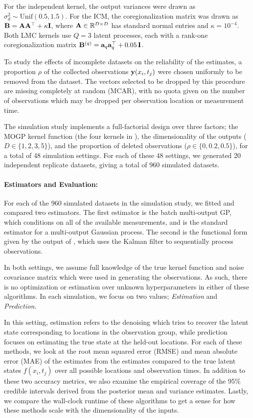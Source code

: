 \documentclass[10pt]{article}
\numberwithin{equation}{section}
\begin{document}
For the independent kernel, the output variances were drawn as $\sigma^{2}_{d} \sim \mathrm{Unif}(0.5, 1.5)$. For the ICM, the coregionalization matrix was drawn as $\mathbf{B} = \mathbf{A}\mathbf{A}^{\top} + \kappa\mathbf{I}$, where $\mathbf{A} \in \mathbb{R}^{D \times D}$ has standard normal entries and $\kappa = 10^{-4}$. Both LMC kernels use $Q = 3$ latent processes, each with a rank-one coregionalization matrix $\mathbf{B}^{(q)} = \mathbf{a}_{q}\mathbf{a}_{q}^{\top} + 0.05\,\mathbf{I}$.

To study the effects of incomplete datasets on the reliability of the estimates, a proportion $\rho$ of the collected observations $\mathbf{y}(x_{i}, t_{j})$ were chosen uniformly to be removed from the dataset. The vectors selected to be dropped by this procedure are missing completely at random (MCAR), with no quota given on the number of observations which may be dropped per observation location or measurement time.

The simulation study implements a full-factorial design over three factors; the MOGP kernel function (the four kernels in ), the dimensionality of the outputs ($D \in \{1, 2, 3, 5\}$), and the proportion of deleted observations ($\rho \in \{0, 0.2, 0.5\}$), for a total of 48 simulation settings. For each of these 48 settings, we generated 20 independent replicate datasets, giving a total of 960 simulated datasets.

\paragraph{Estimators and Evaluation:}
For each of the 960 simulated datasets in the simulation study, we fitted and compared two estimators. The first estimator is the batch multi-output GP, which conditions on all of the available measurements, and is the standard estimator for a multi-output Gaussian process. The second is the functional form given by the output of , which uses the Kalman filter to sequentially process observations. 

In both settings, we assume full knowledge of the true kernel function and noise covariance matrix which were used in generating the observations. As such, there is no optimization or estimation over unknown hyperparameters in either of these algorithms. In each simulation, we focus on two values; \emph{Estimation} and \emph{Prediction}.

In this setting, estimation refers to the denoising which tries to recover the latent state corresponding to locations in the observation group, while prediction focuses on estimating the true state at the held-out locations. For each of these methods, we look at the root mean squared error (RMSE) and mean absolute error (MAE) of the estimates from the  estimates compared to the true latent states $f(x_{i}, t_{j})$ over all possible locations and observation times. In addition to these two accuracy metrics, we also examine the empirical coverage of the 95\% credible intervals derived from the posterior mean and variance estimates. Lastly, we compare the wall-clock runtime of these algorithms to get a sense for how these methods scale with the dimensionality of the inputs.
\end{document}
